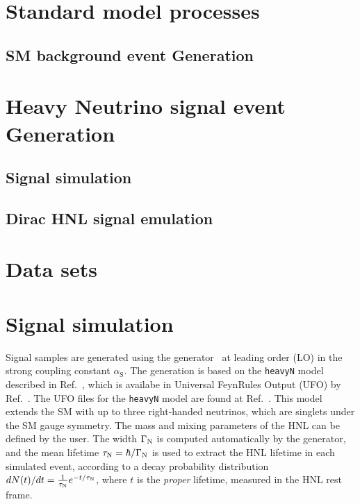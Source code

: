 \section{Standard model processes}\label{sec:c4sm}
\subsection{SM background event Generation}
\section{Heavy Neutrino signal event Generation}\label{sec:c4hnl}
\subsection{Signal simulation}\label{sec:c4hnlmodel}
\subsection{Dirac HNL signal emulation}\label{sec:c4diracmajo}
\section{Data sets}\label{sec:c4data}





\section{Signal simulation}
\label{sec:signal}

Signal samples are generated using the \MGvATNLO
generator~\cite{Alwall:2014hca} at leading order (LO) in the strong
coupling constant $\alpha_{\mathrm{S}}$.
The generation is based on the \texttt{heavyN} model described in
Ref.~\cite{Atre:2009rg}, which is availabe in Universal FeynRules
Output (UFO) by Ref.~\cite{Alva:2014gxa,Degrande:2016aje}.
The UFO files for the \texttt{heavyN} model are found at
Ref.~\cite{heavyN}.
This model extends the SM with up to three right-handed neutrinos,
which are singlets under the SM gauge symmetry.
The mass and mixing parameters of the HNL can be defined by the user.
The width $\Gamma_{\mathrm{N}}$ is computed automatically by the
generator, and the mean lifetime $\tau_{\mathrm{N}} = \hbar/\Gamma_{\mathrm{N}}$
is used to extract the HNL lifetime in each simulated event,
according to a decay probability distribution
$dN(t)/dt = \frac{1}{\tau_{\mathrm{N}}}e^{-t/\tau_{\mathrm{N}}}$, where $t$ is the
\emph{proper} lifetime, measured in the HNL rest frame.

